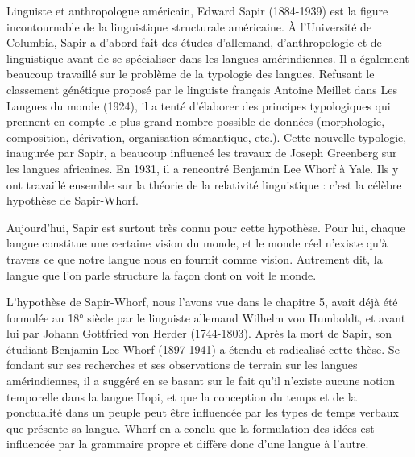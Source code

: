 
Linguiste et anthropologue américain, Edward Sapir (1884-1939) est la figure incontournable de la linguistique structurale américaine. À l’Université de Columbia, Sapir a d’abord fait des études d’allemand, d’anthropologie et de linguistique avant de se spécialiser dans les langues amérindiennes. Il a également beaucoup travaillé sur le problème de la typologie des langues. Refusant le classement génétique proposé par le linguiste français Antoine Meillet dans Les Langues du monde (1924), il a tenté d’élaborer des principes typologiques qui prennent en compte le plus grand nombre possible de données (morphologie, composition, dérivation, organisation sémantique, etc.). Cette nouvelle typologie, inaugurée par Sapir, a beaucoup influencé les travaux de Joseph Greenberg sur les langues africaines. En 1931, il a rencontré Benjamin Lee Whorf à Yale. Ils y ont travaillé ensemble sur la théorie de la relativité linguistique : c’est la célèbre hypothèse de Sapir-Whorf.\par

Aujourd’hui, Sapir est surtout très connu pour cette hypothèse. Pour lui, chaque langue constitue une certaine vision du monde, et le monde réel n’existe qu’à travers ce que notre langue nous en fournit comme vision. Autrement dit, la langue que l’on parle structure la façon dont on voit le monde.\par

L'hypothèse de Sapir-Whorf, nous l’avons vue dans le chapitre 5, avait déjà été formulée au 18° siècle par le linguiste allemand Wilhelm von Humboldt, et avant lui par Johann Gottfried von Herder (1744-1803). Après la mort de Sapir, son étudiant Benjamin Lee Whorf (1897-1941) a étendu et radicalisé cette thèse. Se fondant sur ses recherches et ses observations de terrain sur les langues amérindiennes, il a suggéré en se basant sur le fait qu’il n’existe aucune notion temporelle dans la langue Hopi, et que la conception du temps et de la ponctualité dans un peuple peut être influencée par les types de temps verbaux que présente sa langue. Whorf en a conclu que la formulation des idées est influencée par la grammaire propre et diffère donc d’une langue à l’autre.\par



